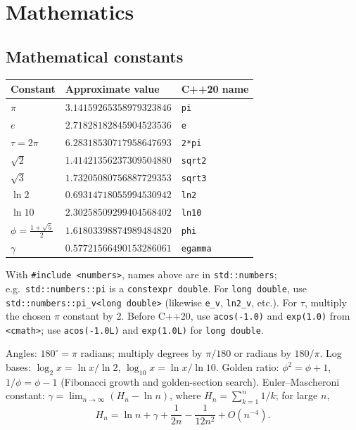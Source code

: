 
\chapter{Mathematics}

\section{Mathematical constants}
\begin{center}
\begin{tabular}{@{}lll@{}}
Constant & Approximate value & C++20 name \\ \hline
$\pi$ & $3.14159265358979323846$ & \texttt{pi} \\
$e$ & $2.71828182845904523536$ & \texttt{e} \\
$\tau=2\pi$ & $6.28318530717958647693$ & \texttt{2*pi} \\
$\sqrt{2}$ & $1.41421356237309504880$ & \texttt{sqrt2} \\
$\sqrt{3}$ & $1.73205080756887729353$ & \texttt{sqrt3} \\
$\ln 2$ & $0.69314718055994530942$ & \texttt{ln2} \\
$\ln 10$ & $2.30258509299404568402$ & \texttt{ln10} \\
$\phi=\frac{1+\sqrt{5}}{2}$ & $1.61803398874989484820$ & \texttt{phi} \\
$\gamma$ & $0.57721566490153286061$ & \texttt{egamma} \\
\end{tabular}
\end{center}

With \texttt{\#include <numbers>}, names above are in
\texttt{std::numbers}; e.g.\ \texttt{std::numbers::pi} is a
\texttt{constexpr double}. For \texttt{long double}, use
\texttt{std::numbers::pi\_v<long double>} (likewise
\texttt{e\_v}, \texttt{ln2\_v}, etc.). For $\tau$, multiply the
chosen $\pi$ constant by 2.
Before C++20, use \texttt{acos(-1.0)} and \texttt{exp(1.0)}
from \texttt{<cmath>}; use \texttt{acos(-1.0L)} and
\texttt{exp(1.0L)} for \texttt{long double}.

Angles: $180^\circ=\pi$ radians; multiply degrees by $\pi/180$
or radians by $180/\pi$.
Log bases: $\log_2 x=\ln x/\ln 2$,
$\log_{10}x=\ln x/\ln 10$.
Golden ratio: $\phi^2=\phi+1$, $1/\phi=\phi-1$ (Fibonacci
growth and golden-section search).
Euler--Mascheroni constant:
$\gamma=\lim_{n\to\infty}(H_n-\ln n)$, where
$H_n=\sum_{k=1}^n 1/k$; for large $n$,
\[
H_n=\ln n+\gamma+\frac{1}{2n}-\frac{1}{12n^2}+O(n^{-4}).
\]

